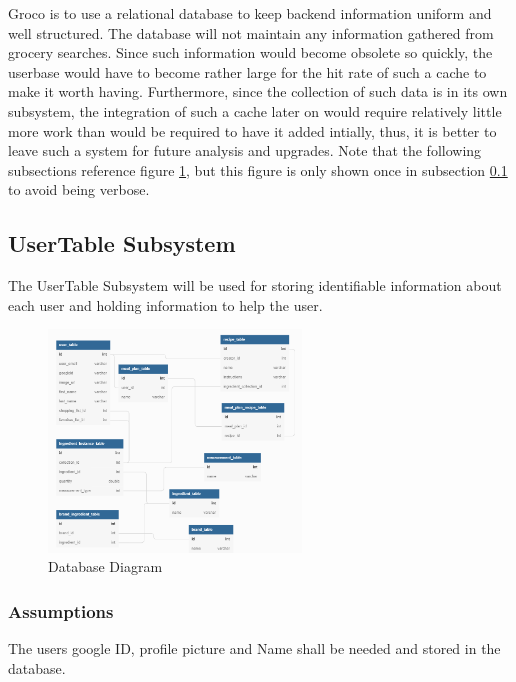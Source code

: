 Groco is to use a relational database to keep backend information uniform and well structured.  The database will not maintain any information gathered from grocery searches.  Since such information would become obsolete so quickly, the userbase would have to become rather large for the hit rate of such a cache to make it worth having.  Furthermore, since the collection of such data is in its own subsystem, the integration of such a cache later on would require relatively little more work than would be required to have it added intially, thus, it is better to leave such a system for future analysis and upgrades.  Note that the following subsections reference figure \ref{fig:db.1}, but this figure is only shown once in subsection \ref{section:db.1} to avoid being verbose.


\subsection{UserTable Subsystem}\label{section:db.1}
The UserTable Subsystem will be used for storing identifiable information about each user and holding information to help the user.

\begin{figure}[h!]\label{fig:db.1}
	\centering
 	\includegraphics[width=0.60\textwidth]{images/databasenew.png}
 \caption{Database Diagram}
\end{figure}

\subsubsection{Assumptions}
The users google ID, profile picture and Name shall be needed and stored in the database.

